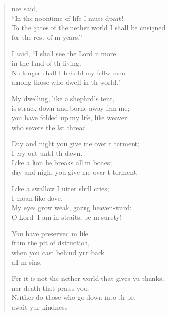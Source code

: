 \begin{verse}
  \begin{patverse}
    nce  said,\Med\\
“In the noontime of life I must dpart!\\
To the gates of the nether world I shall be cnsigned\Med\\
for the rest of m years.”

I said, “I shall see the Lord n more\Med\\
in the land of th living.\\
No longer shall I behold my fellw men\Med\\
among those who dwell in th world.”

My dwelling, like a shephrd’s tent,\Med\\
is struck down and borne away frm me;\\
you have folded up my life, like  weaver\Med\\
who severs the lst thread.

Day and night you give me over t torment;\Med\\
I cry out until th dawn.\\
Like a lion he breaks all m bones;\Med\\
day and night you give me over t torment.

Like a swallow I utter shr\pointup{\i}ll cries;\Med\\
I moan like  dove.\\
My eyes grow weak, gaz\pointup{\i}ng heaven-ward:\Med\\
O Lord, I am in straits; be m surety!

You have preserved m life\Med\\
from the pit of dstruction,\\
when you cast behind yur back\Med\\
all m sins.

For it is not the nether world that gives yu thanks,\Med\\
nor death that praiss you;\\
Neither do those who go down into th pit\Med\\
await yur kindness.


\end{patverse}
\end{verse}
